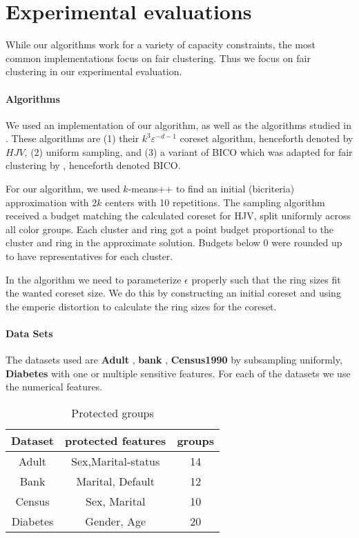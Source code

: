 \section{Experimental evaluations}
While our algorithms work for a variety of capacity constraints, the most common implementations focus on fair clustering. Thus we focus on fair clustering in our experimental evaluation. 

\paragraph{Algorithms}
We used an implementation of our algorithm, as well as the algorithms studied in \cite{HuangJV19}. These algorithms are (1) their $k^3 \varepsilon^{-d-1}$ coreset algorithm, henceforth denoted by $HJV$, (2) uniform sampling, and (3) a variant of BICO \cite{FGSSS13} which was adapted for fair clustering by \cite{SSS19}, henceforth denoted BICO.

For our algorithm, we used $k$-means++ \cite{ArV07} to find an initial (bicriteria) approximation with $2k$ centers with 10 repetitions.
The sampling algorithm received a budget matching the calculated coreset for HJV, split  uniformly across all color groups. Each cluster and ring got a point budget proportional to the cluster and ring in the approximate solution. Budgets below 0 were rounded up to have representatives for each cluster.

In the algorithm we need to parameterize $\epsilon$ properly such that the ring sizes fit the wanted coreset size. We do this by constructing an initial coreset and using the emperic distortion to calculate the ring sizes for the coreset.  

\paragraph{Data Sets}
The datasets used are \textbf{Adult} \cite{adult_dataset}, \textbf{bank} \cite{MORO201422}, \textbf{Census1990} \cite{Census1990_dataset} by subsampling uniformly, \textbf{Diabetes} \cite{Diabetes_Dataset} with one or multiple sensitive features. For each of the datasets we use the numerical features.
\begin{table}[h]
\centering
\caption{Protected groups}
\begin{tabular}{|c|c|c|}
\hline
Dataset & protected features & groups\\
\hline
    Adult & Sex,Marital-status & 14 \\
    Bank & Marital, Default & 12 \\
    Census & Sex, Marital & 10 \\
    Diabetes & Gender, Age & 20 \\
\hline
\end{tabular}
\end{table}

